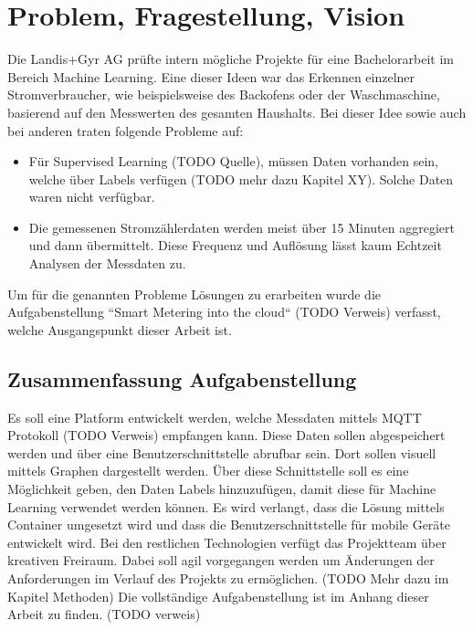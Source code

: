 \chapter{Problem, Fragestellung, Vision}

Die Landis+Gyr AG prüfte intern mögliche Projekte für eine Bachelorarbeit im Bereich Machine Learning.
Eine dieser Ideen war das Erkennen einzelner Stromverbraucher, wie beispielsweise des Backofens oder der Waschmaschine,
basierend auf den Messwerten des gesamten Haushalts.
Bei dieser Idee sowie auch bei anderen traten folgende Probleme auf:
\begin{itemize}
    \item Für Supervised Learning (TODO Quelle), müssen Daten vorhanden sein,
          welche über Labels verfügen (TODO mehr dazu Kapitel XY).
          Solche Daten waren nicht verfügbar.
    \item Die gemessenen Stromzählerdaten werden meist über 15 Minuten aggregiert und dann übermittelt.
          Diese Frequenz und Auflösung lässt kaum Echtzeit Analysen der Messdaten zu.

\end{itemize}

Um für die genannten Probleme Lösungen zu erarbeiten wurde die Aufgabenstellung ``Smart Metering into the cloud`` (TODO Verweis) verfasst,
welche Ausgangspunkt dieser Arbeit ist.

\section{Zusammenfassung Aufgabenstellung}
\label{aufgabenstellung}

Es soll eine Platform entwickelt werden, welche Messdaten mittels MQTT Protokoll (TODO Verweis) empfangen kann.
Diese Daten sollen abgespeichert werden und über eine Benutzerschnittstelle abrufbar sein. Dort sollen visuell mittels Graphen dargestellt werden.
Über diese Schnittstelle soll es eine Möglichkeit geben, den Daten Labels hinzuzufügen, damit diese für Machine Learning verwendet werden können.
Es wird verlangt, dass die Lösung mittels Container umgesetzt wird und dass die Benutzerschnittstelle für mobile Geräte entwickelt wird.
Bei den restlichen Technologien verfügt das Projektteam über kreativen Freiraum. %
Dabei soll agil vorgegangen werden um Änderungen der Anforderungen im Verlauf des Projekts zu ermöglichen. (TODO Mehr dazu im Kapitel Methoden)
Die vollständige Aufgabenstellung ist im Anhang dieser Arbeit zu finden. (TODO verweis)


